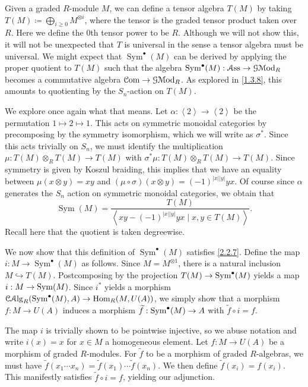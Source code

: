 \begin{discussion}\label{2.2.8}
	Given a graded $R$-module $M$, we can define a tensor algebra $T(M)$ by taking $T(M)\coloneqq \bigoplus_{i\geq 0} M^{\otimes i} $, where the tensor is the graded tensor product taken over $R$. Here we define the 0th tensor power to be $R$. Although we will not show this, it will not be unexpected that $T$ is universal in the sense a tensor algebra must be universal. We might expect that $\operatorname{Sym}^{\bullet}  (M)$ can be derived by applying the proper quotient to $T(M)$ such that the algebra $\operatorname{Sym}^{\bullet}  (M): \mathcal{A} \mathrm{ss}  \to \mathcal{G} \mathcal{M}\mathrm{od} _R$ becomes a commutative algebra $\mathcal{C} \mathrm{om} \to \mathcal{G} \mathcal{M}\mathrm{od} _R$. As explored in \cref{1.3.8}, this amounts to quotienting by the $S_n$-action on $T(M)$.

	We explore once again what that means. Let $\alpha : \left\langle 2 \right\rangle  \to \left\langle 2 \right\rangle $ be the permutation $1\mapsto 2\mapsto 1$. This acts on symmetric monoidal categories by precomposing by the symmetry isomorphism, which we will write as $\sigma ^*$. Since this acts trivially on $S_n$, we must identify the multiplication $\mu : T(M)\otimes _RT(M) \to T(M)$ with $\sigma ^*\mu : T(M)\otimes _RT(M) \to T(M)$. Since symmetry is given by Koszul braiding, this implies that we have an equality between $\mu (x\otimes y)=xy$ and $(\mu \circ \sigma )(x\otimes y) = (-1)^{\left| x \right| \left| y \right| } yx$. Of course since $\alpha $ generates the $S_n$ action on symmetric monoidal categories, we obtain that
	\[
		\operatorname{Sym} (M) = \frac{T(M)}{  \left\langle xy-(-1)^{\left| x \right| \left| y \right| } yx \mid x,y\in T(M) \right\rangle} 
	.\]
	Recall here that the quotient is taken degreewise.

	We now show that this definition of $\operatorname{Sym}^{\bullet}  (M)$ satisfies \cref{2.2.7}. Define the map $i : M \to \operatorname{Sym}^{\bullet}  (M)$ as follows. Since $M=M^{\otimes 1} $, there is a natural inclusion $M\hookrightarrow T(M)$. Postcomposing by the projection $T(M)\to \operatorname{Sym}^{\bullet}  (M)$ yields a map $i : M \to \operatorname{Sym} (M)$. Since $i^*$ yields a morphism $\mathcal{C} \mathcal{A}\mathrm{lg}_{R} (\operatorname{Sym}^{\bullet}  (M),A) \to \operatorname{Hom}_{R}(M, U(A)) $, we simply show that a morphism $f : M \to U(A)$ induces a morphism $\widetilde{f} : \operatorname{Sym}^{\bullet}  (M) \to A$ with $\widetilde{f} \circ i=f$.

	The map $i$ is trivially shown to be pointwise injective, so we abuse notation and write $i(x)=x$ for $x\in M$ a homogeneous element. Let $f : M \to U(A)$ be a morphism of graded $R$-modules. For $\widetilde{f} $ to be a morphism of graded $R$-algebras, we must have $\widetilde{f} (x_1 \cdots x_n) = \widetilde{f} (x_1)\cdots \widetilde{f} (x_n)$. We then define $\widetilde{f} (x_i) = f(x_i)$. This manifestly satisfies $\widetilde{f} \circ i=f$, yielding our adjunction.
\end{discussion}

